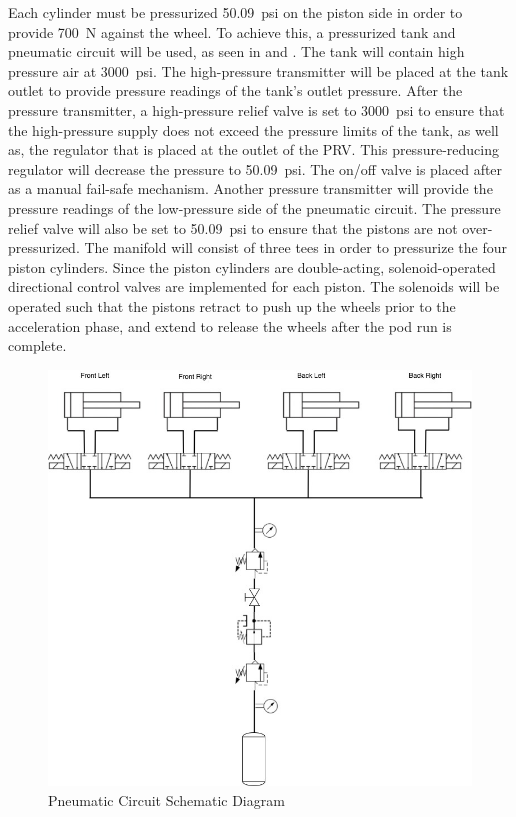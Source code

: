 \documentclass[main.tex]{subfiles}
\begin{document}
	Each cylinder must be pressurized \SI{50.09}{psi} on the piston side in order to provide \SI{700}{N} against the wheel. To achieve this, a pressurized tank and pneumatic circuit will be used, as seen in  and . The tank will contain high pressure air at \SI{3000}{psi}. The high-pressure transmitter will be placed at the tank outlet to provide pressure readings of the tank’s outlet pressure. After the pressure transmitter, a high-pressure relief valve is set to \SI{3000}{psi} to ensure that the high-pressure supply does not exceed the pressure limits of the tank, as well as, the regulator that is placed at the outlet of the PRV. This pressure-reducing regulator will decrease the pressure to \SI{50.09}{psi}. The on/off valve is placed after as a manual fail-safe mechanism. Another pressure transmitter will provide the pressure readings of the low-pressure side of the pneumatic circuit. The pressure relief valve will also be set to \SI{50.09}{psi} to ensure that the pistons are not over-pressurized. The manifold will consist of three tees in order to pressurize the four piston cylinders.  Since the piston cylinders are double-acting, solenoid-operated directional control valves are implemented for each piston. The solenoids will be operated such that the pistons retract to push up the wheels prior to the acceleration phase, and extend to release the wheels after the pod run is complete.\\

	\begin{figure}
        \centering
        \includegraphics[width=\linewidth] {images/Pneumatic_Circuit}
        \caption{Pneumatic Circuit Schematic Diagram}
        \label{fig:pneumatic-diagram}
    \end{figure}
\end{document}
